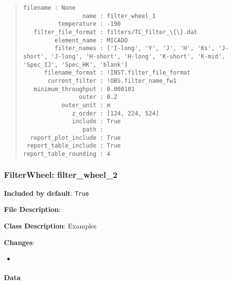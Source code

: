 \begin{quote}
\begin{alltt}
\begin{lstlisting}[frame=single]
             filename : None
                 name : filter_wheel_1
          temperature : -190
   filter_file_format : filters/TC_filter_\{\}.dat
         element_name : MICADO
         filter_names : ['I-long', 'Y', 'J', 'H', 'Ks', 'J-short', 'J-long', 'H-short', 'H-long', 'K-short', 'K-mid', 'Spec_IJ', 'Spec_HK', 'blank']
      filename_format : !INST.filter_file_format
       current_filter : !OBS.filter_name_fw1
   minimum_throughput : 0.000101
                outer : 0.2
           outer_unit : m
              z_order : [124, 224, 524]
              include : True
                 path :
  report_plot_include : True
 report_table_include : True
report_table_rounding : 4
\end{lstlisting}
\end{alltt}
\end{quote}


\subsubsection{FilterWheel: \textquotedbl{}filter\_wheel\_2\textquotedbl{}%
  \label{filterwheel-filter-wheel-2}%
}

\textbf{Included by default}: \texttt{True}

\textbf{File Description}:

\textbf{Class Description}: Examples

\textbf{Changes}:

\begin{itemize}
\item \end{itemize}


\paragraph{Data%
  \label{id5}%
}

\begin{figure}[H]
\noindent{}\label{fig-filter-wheel-2}
\end{figure}

